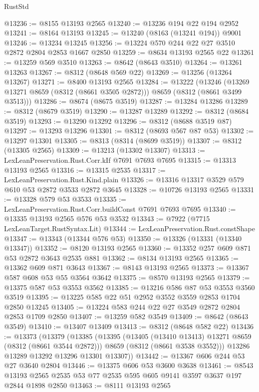 \begin{lexlean}{RustStd}
\begin{coremodule}
@13236 := @8155 @13193 @2565
@13240 := @13236 @194 @22 @194 @2952
@13241 := @8164 @13193
@13245 := @13240 (@8163 (@13241 @194)) @9001
@13246 := @13234 @13245
@13256 := @13224 @570 @244 @22 @27 @3510 @2872 @2804 @2853 @1667 @2850
@13259 := @8634 @13193 @2565 @22
@13261 := @13259 @569 @3510
@13263 := @8642 (@8643 @3510)
@13264 := @13261 @13263
@13267 := @8312 (@8648 @569 @22)
@13269 := @13256 (@13264 @13267)
@13271 := @8400 @13193 @2565
@13284 := @13222
    (@13246 (@13269 @13271 @8659 (@8312 (@8661 @3505 @2872))) @8659 (@8312 (@8661 @3499 @3513)))
@13286 := @8674 (@8675 @3519)
@13287 := @13284 @13286
@13289 := @8312 (@8679 @3519)
@13290 := @13287 @13289
@13292 := @8312 (@8684 @3519)
@13293 := @13290 @13292
@13296 := @8312 (@8688 @3519 @87)
@13297 := @13293 @13296
@13301 := @8312 (@8693 @567 @87 @53)
@13302 := @13297 @13301
@13305 := @8313 (@8314 (@8699 @3519))
@13307 := @8312 (@13305 @2565)
@13309 := @13213 (@13302 @13307)
@13313 := LexLeanPreservation.Rust.Corr.kIf @7691 @7693 @7695
@13315 := @13313 @13193 @2565
@13316 := @13315 @2535
@13317 := LexLeanPreservation.Rust.Kind.plain
@13326 := @13316 @13317 @3529 @579 @610 @53 @2872 @3533 @2872 @3645
@13328 := @10726 @13193 @2565
@13331 := @13328 @579 @53 @3533
@13335 := LexLeanPreservation.Rust.Corr.buildConst @7691 @7693 @7695
@13340 := @13335 @13193 @2565 @576 @53 @3532
@13343 := @7922 (@7715 LexLeanTarget.RustSyntax.Lit)
@13344 := LexLeanPreservation.Rust.constShape
@13347 := @13343 (@13344 @576 @53)
@13350 := @13326 (@13331 (@13340 @13347))
@13352 := @8120 @13193 @2565
@13360 := @13352 @257 @609 @871 @53 @2872 @3643 @2535 @881
@13362 := @8134 @13193 @2565
@13365 := @13362 @609 @871 @3643
@13367 := @8143 @13193 @2565
@13373 := @13367 @587 @608 @53 @55 @3564 @3642
@13375 := @8570 @13193 @2565
@13379 := @13375 @587 @53 @3553 @3562
@13385 := @13216 @586 @87 @53 @3553 @3560 @3519
@13395 := @13225 @585 @22 @51 @2952 @3552 @3559 @2853 @1704 @2850 @13245
@13405 := @13224 @583 @244 @22 @27 @3549 @2872 @2804 @2853 @1709 @2850
@13407 := @13259 @582 @3549
@13409 := @8642 (@8643 @3549)
@13410 := @13407 @13409
@13413 := @8312 (@8648 @582 @22)
@13436 := @13373
    (@13379
      (@13385
        (@13395
          (@13405 (@13410 @13413) @13271 @8659 (@8312 (@8661 @3544 @2872)))
          @8659
          (@8312 (@8661 @3538 @3552)))
        @13286
        @13289
        @13292
        @13296
        @13301
        @13307))
@13442 := @13367 @606 @244 @53 @27 @3640 @2804
@13446 := @13375 @606 @53 @3600 @3638
@13461 := @8543 @13193 @2565 @2535 @53 @77 @2535 @595 @605 @9141 @3597 @3637 @197 @2844 @1898 @2850
@13463 := @8111 @13193 @2565

\end{coremodule}
\end{lexlean}
